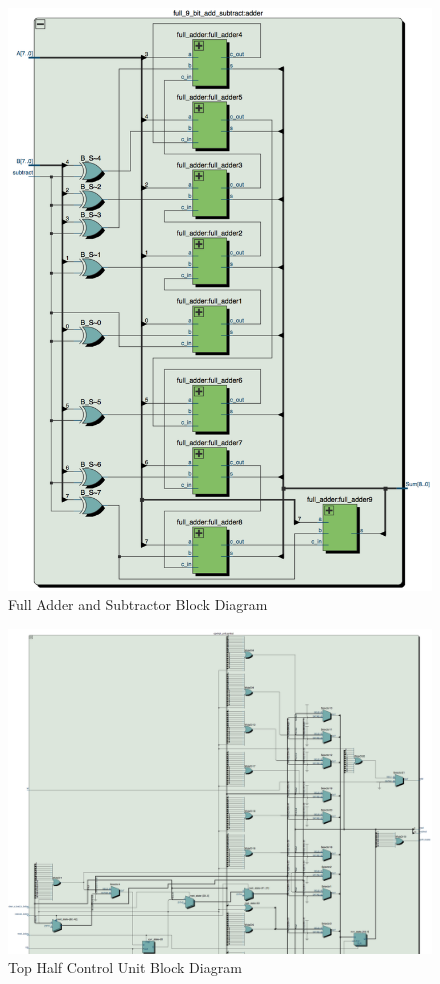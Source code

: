 \documentclass[journal, twocolumn, final,11pt,letterpaper]{IEEEtran}
\begin{document}
\begin{figure} [htbp]
	\centering
	\includegraphics[scale=0.5]{full-adder-subtractor-diagram.png}
	\caption{Full Adder and Subtractor Block Diagram\label{fig:full-adder-subtractor-diagram}}
\end{figure}

\begin{figure} [htbp]
	\centering
	\includegraphics[scale=0.55]{control-unit-top-half-diagram.png}
		\caption{Top Half Control Unit Block Diagram\label{fig:top-half-control}}
\end{figure}
\end{document}
